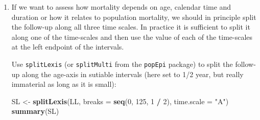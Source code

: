 \documentclass[
]{book}
\newenvironment{Shaded}{\begin{snugshade}}{\end{snugshade}}
\newcommand{\AttributeTok}[1]{\textcolor[rgb]{0.13,0.29,0.53}{#1}}
\newcommand{\CommentTok}[1]{\textcolor[rgb]{0.56,0.35,0.01}{\textit{#1}}}
\newcommand{\DecValTok}[1]{\textcolor[rgb]{0.00,0.00,0.81}{#1}}
\newcommand{\FunctionTok}[1]{\textcolor[rgb]{0.13,0.29,0.53}{\textbf{#1}}}
\newcommand{\NormalTok}[1]{#1}
\newcommand{\OtherTok}[1]{\textcolor[rgb]{0.56,0.35,0.01}{#1}}
\newcommand{\SpecialCharTok}[1]{\textcolor[rgb]{0.81,0.36,0.00}{\textbf{#1}}}
\newcommand{\StringTok}[1]{\textcolor[rgb]{0.31,0.60,0.02}{#1}}
\begin{document}
\begin{enumerate}
\begin{Shaded}
\begin{Highlighting}[]
\NormalTok{ {-}{-}{-}{-}{-}{-}{-}{-}{-}{-}{-}{-}{-}{-}{-}{-}{-}{-}{-}{-}{-}{-}{-}{-}{-}{-}{-}{-}{-}{-}{-}{-}{-} }
\NormalTok{ sex           D        Y    rate  }
\NormalTok{ {-}{-}{-}{-}{-}{-}{-}{-}{-}{-}{-}{-}{-}{-}{-}{-}{-}{-}{-}{-}{-}{-}{-}{-}{-}{-}{-}{-}{-}{-}{-}{-}{-} }
\NormalTok{ M       1343.00 27614.21   48.63  }
\NormalTok{ F       1156.00 26659.05   43.36  }

\NormalTok{ Total   2499.00 54273.27   46.04  }
\NormalTok{ {-}{-}{-}{-}{-}{-}{-}{-}{-}{-}{-}{-}{-}{-}{-}{-}{-}{-}{-}{-}{-}{-}{-}{-}{-}{-}{-}{-}{-}{-}{-}{-}{-} }
\end{Highlighting}
\end{Shaded}

\begin{Shaded}
\begin{Highlighting}[]
\CommentTok{\# stat.table is more versatile than xtabs:}
\FunctionTok{xtabs}\NormalTok{(}\FunctionTok{cbind}\NormalTok{(}\AttributeTok{D =}\NormalTok{ lex.Xst }\SpecialCharTok{==} \StringTok{"Dead"}\NormalTok{,}
            \AttributeTok{Y =}\NormalTok{ lex.dur) }
      \SpecialCharTok{\textasciitilde{}}\NormalTok{ sex, }
      \AttributeTok{data =}\NormalTok{ LL)}
\end{Highlighting}
\end{Shaded}

\begin{Shaded}
\begin{Highlighting}[]

\NormalTok{sex     D     Y}
\NormalTok{  M  1343 27614}
\NormalTok{  F  1156 26659}
\end{Highlighting}
\end{Shaded}
\item
  If we want to assess how mortality depends on age, calendar time
  and duration or how it relates to population mortality, we should
  in principle split the follow-up along all
  three time scales. In practice it is sufficient to split it along
  one of the time-scales and then use the value of each of the
  time-scales at the left endpoint of the intervals.

  Use \texttt{splitLexis} (or \texttt{splitMulti} from the
  \texttt{popEpi} package) to split the follow-up along the
  age-axis in sutiable intervals (here set to 1/2 year, but really
  immaterial as long as it is small):

\begin{Shaded}
\begin{Highlighting}[]
\NormalTok{SL }\OtherTok{\textless{}{-}} \FunctionTok{splitLexis}\NormalTok{(LL, }
                 \AttributeTok{breaks =} \FunctionTok{seq}\NormalTok{(}\DecValTok{0}\NormalTok{, }\DecValTok{125}\NormalTok{, }\DecValTok{1} \SpecialCharTok{/} \DecValTok{2}\NormalTok{), }
             \AttributeTok{time.scale =} \StringTok{"A"}\NormalTok{)}
\FunctionTok{summary}\NormalTok{(SL)}
\end{Highlighting}
\end{Shaded}


\end{enumerate}
\end{document}
